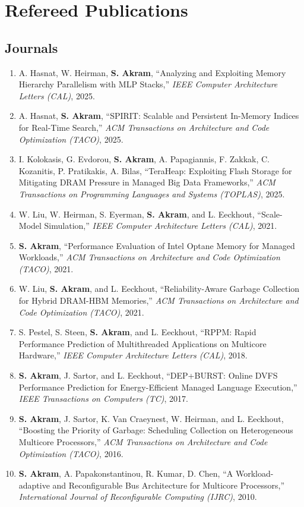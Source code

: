 \documentclass[11pt,a4paper,sans]{moderncv}
\begin{document}
\section{Refereed Publications}
\subsection{Journals}
{\small
\begin{enumerate}
\item A. Hasnat, W. Heirman, \textbf{S. Akram}, ``Analyzing and Exploiting Memory Hierarchy Parallelism with MLP Stacks,'' \emph{IEEE Computer Architecture Letters (CAL)}, 2025.
\item A. Hasnat, \textbf{S. Akram}, ``SPIRIT: Scalable and Persistent In-Memory Indices for Real-Time Search,'' \emph{ACM Transactions on Architecture and Code Optimization (TACO)}, 2025.
\item I. Kolokasis, G. Evdorou, \textbf{S. Akram}, A. Papagiannis, F. Zakkak, C. Kozanitis, P. Pratikakis, A. Bilas, ``TeraHeap: Exploiting Flash Storage for Mitigating DRAM Pressure in Managed Big Data Frameworks,'' \emph{ACM Transactions on Programming Languages and Systems (TOPLAS)}, 2025.
\item W. Liu, W. Heirman, S. Eyerman, \textbf{S. Akram}, and L. Eeckhout, ``Scale-Model Simulation,'' \emph{IEEE Computer Architecture Letters (CAL)}, 2021.
\item \textbf{S. Akram}, ``Performance Evaluation of Intel Optane Memory for Managed Workloads,'' \emph{ACM Transactions on Architecture and Code Optimization (TACO)}, 2021.
\item W. Liu, \textbf{S. Akram}, and L. Eeckhout, ``Reliability-Aware Garbage Collection for Hybrid DRAM-HBM Memories,'' \emph{ACM Transactions on Architecture and Code Optimization (TACO)}, 2021.
\item S. Pestel, S. Steen, \textbf{S. Akram}, and L. Eeckhout, ``RPPM: Rapid Performance Prediction of Multithreaded Applications on Multicore Hardware,'' \emph{IEEE Computer Architecture Letters (CAL)}, 2018.
\item \textbf{S. Akram}, J. Sartor, and L. Eeckhout, ``DEP+BURST: Online DVFS Performance Prediction for Energy-Efficient Managed Language Execution,'' \emph{IEEE Transactions on Computers (TC)}, 2017.
\item \textbf{S. Akram}, J. Sartor, K. Van Craeynest, W. Heirman, and L. Eeckhout, ``Boosting the Priority of Garbage: Scheduling Collection on Heterogeneous Multicore Processors,'' \emph{ACM Transactions on Architecture and Code Optimization (TACO)}, 2016.
\item \textbf{S. Akram}, A. Papakonstantinou, R. Kumar, D. Chen, ``A Workload-adaptive and Reconfigurable Bus Architecture for Multicore Processors,'' \emph{International Journal of Reconfigurable Computing (IJRC)}, 2010.
\end{enumerate}
}
\end{document}
